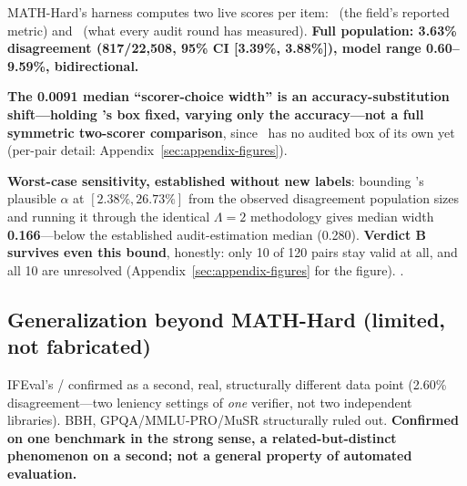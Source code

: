 MATH-Hard's harness computes two live scores per item: \exactmatch\ (the
field's reported metric) and \scoreboxed\ (what every audit round has
measured). \textbf{Full population: 3.63\% disagreement (817/22{,}508, 95\%
CI [3.39\%, 3.88\%]), model range 0.60--9.59\%, bidirectional.}

\textbf{The 0.0091 median ``scorer-choice width'' is an accuracy-substitution
shift---holding \scoreboxed's box fixed, varying only the accuracy---not a
full symmetric two-scorer comparison}, since \exactmatch\ has no audited
box of its own yet (per-pair detail: Appendix~\ref{sec:appendix-figures}).

\textbf{Worst-case sensitivity, established without new labels}: bounding
\exactmatch's plausible $\alpha$ at $[2.38\%,26.73\%]$ from the observed
disagreement population sizes and running it through the identical
$\Lambda=2$ methodology gives median width \textbf{0.166}---below the
established audit-estimation median (0.280). \textbf{Verdict B survives
even this bound}, honestly: only 10 of 120 pairs stay valid at all, and all
10 are unresolved (Appendix~\ref{sec:appendix-figures} for the figure).
.

\subsection{Generalization beyond MATH-Hard (limited, not fabricated)}
\label{sec:results-generalization}

IFEval's / confirmed as a second, real,
structurally different data point (2.60\% disagreement---two leniency
settings of \emph{one} verifier, not two independent libraries). BBH,
GPQA/MMLU-PRO/MuSR structurally ruled out. \textbf{Confirmed on one
benchmark in the strong sense, a related-but-distinct phenomenon on a
second; not a general property of automated evaluation.}
